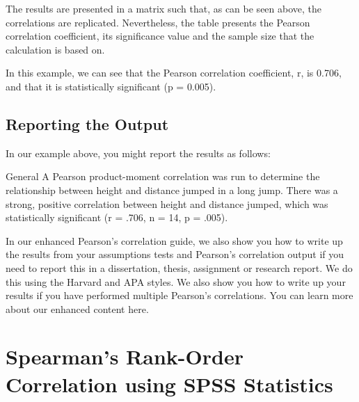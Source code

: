 \documentclass[]{article}
\begin{document}
The results are presented in a matrix such that, as can be seen above, the correlations are replicated. Nevertheless, the table presents the Pearson correlation coefficient, its significance value and the sample size that the calculation is based on.

In this example, we can see that the Pearson correlation coefficient, r, is 0.706, and that it is statistically significant (p = 0.005). 

\subsection{Reporting the Output}
In our example above, you might report the results as follows:

General
A Pearson product-moment correlation was run to determine the relationship between height and distance jumped in a long jump. There was a strong, positive correlation between height and distance jumped, which was statistically significant (r = .706, n = 14, p = .005).

In our enhanced Pearson’s correlation guide, we also show you how to write up the results from your assumptions tests and Pearson’s correlation output if you need to report this in a dissertation, thesis, assignment or research report. We do this using the Harvard and APA styles. We also show you how to write up your results if you have performed multiple Pearson’s correlations. You can learn more about our enhanced content here.


\section{Spearman's Rank-Order Correlation using SPSS Statistics}
\end{document}
